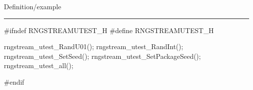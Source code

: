 
Definition/example

\bigskip
\hrule
\code
#ifndef RNGSTREAMUTEST_H
#define RNGSTREAMUTEST_H
\endcode

\code

rngstream_utest_RandU01();
rngstream_utest_RandInt();
rngstream_utest_SetSeed();
rngstream_utest_SetPackageSeed();
rngstream_utest_all();

#endif
\endcode

